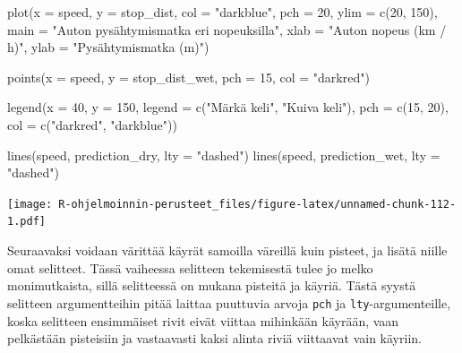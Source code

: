 \documentclass[
]{book}
\newenvironment{Shaded}{\begin{snugshade}}{\end{snugshade}}
\newcommand{\AttributeTok}[1]{\textcolor[rgb]{0.77,0.63,0.00}{#1}}
\newcommand{\DecValTok}[1]{\textcolor[rgb]{0.00,0.00,0.81}{#1}}
\newcommand{\FunctionTok}[1]{\textcolor[rgb]{0.00,0.00,0.00}{#1}}
\newcommand{\NormalTok}[1]{#1}
\newcommand{\StringTok}[1]{\textcolor[rgb]{0.31,0.60,0.02}{#1}}
\begin{document}
\begin{Shaded}
\begin{Highlighting}[]
\FunctionTok{plot}\NormalTok{(}\AttributeTok{x =}\NormalTok{ speed, }\AttributeTok{y =}\NormalTok{ stop\_dist,}
     \AttributeTok{col =} \StringTok{"darkblue"}\NormalTok{, }\AttributeTok{pch =} \DecValTok{20}\NormalTok{,}
     \AttributeTok{ylim =} \FunctionTok{c}\NormalTok{(}\DecValTok{20}\NormalTok{, }\DecValTok{150}\NormalTok{),}
     \AttributeTok{main =} \StringTok{"Auton pysähtymismatka eri nopeuksilla"}\NormalTok{,}
     \AttributeTok{xlab =} \StringTok{"Auton nopeus (km / h)"}\NormalTok{, }\AttributeTok{ylab =} \StringTok{"Pysähtymismatka (m)"}\NormalTok{)}

\FunctionTok{points}\NormalTok{(}\AttributeTok{x =}\NormalTok{ speed, }\AttributeTok{y =}\NormalTok{ stop\_dist\_wet, }\AttributeTok{pch =} \DecValTok{15}\NormalTok{, }\AttributeTok{col =} \StringTok{"darkred"}\NormalTok{)}

\FunctionTok{legend}\NormalTok{(}\AttributeTok{x =} \DecValTok{40}\NormalTok{, }\AttributeTok{y =} \DecValTok{150}\NormalTok{,}
       \AttributeTok{legend =} \FunctionTok{c}\NormalTok{(}\StringTok{"Märkä keli"}\NormalTok{, }\StringTok{"Kuiva keli"}\NormalTok{),}
       \AttributeTok{pch =} \FunctionTok{c}\NormalTok{(}\DecValTok{15}\NormalTok{, }\DecValTok{20}\NormalTok{), }\AttributeTok{col =} \FunctionTok{c}\NormalTok{(}\StringTok{"darkred"}\NormalTok{, }\StringTok{"darkblue"}\NormalTok{))}

\FunctionTok{lines}\NormalTok{(speed, prediction\_dry, }\AttributeTok{lty =} \StringTok{"dashed"}\NormalTok{)}
\FunctionTok{lines}\NormalTok{(speed, prediction\_wet, }\AttributeTok{lty =} \StringTok{"dashed"}\NormalTok{)}
\end{Highlighting}
\end{Shaded}

\texttt{[image: R-ohjelmoinnin-perusteet\_files/figure-latex/unnamed-chunk-112-1.pdf]}

Seuraavaksi voidaan värittää käyrät samoilla väreillä kuin pisteet, ja lisätä niille omat selitteet. Tässä vaiheessa selitteen tekemisestä tulee jo melko monimutkaista, sillä selitteessä on mukana pisteitä ja käyriä. Tästä syystä selitteen argumentteihin pitää laittaa puuttuvia arvoja \texttt{pch} ja \texttt{lty}-argumenteille, koska selitteen ensimmäiset rivit eivät viittaa mihinkään käyrään, vaan pelkästään pisteisiin ja vastaavasti kaksi alinta riviä viittaavat vain käyriin.
\end{document}
